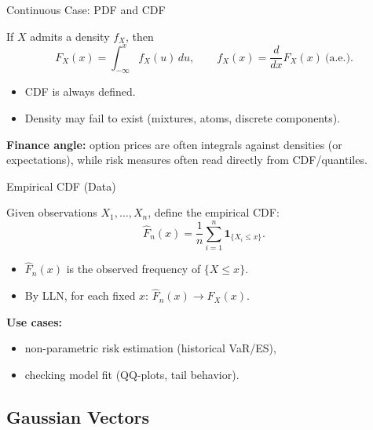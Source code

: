 \documentclass[10pt,aspectratio=169]{beamer}
\begin{document}
\begin{frame}{Continuous Case: PDF and CDF}

If \(X\) admits a density \(f_X\), then\pause
\[
F_X(x) = \int_{-\infty}^{x} f_X(u)\,du,
\qquad
f_X(x) = \frac{d}{dx}F_X(x)\ \text{(a.e.)}.
\]
\pause

\medskip
\begin{itemize}
  \item CDF is always defined.\pause
  \item Density may fail to exist (mixtures, atoms, discrete components).\pause
\end{itemize}

\medskip
\textbf{Finance angle:}\pause\;
option prices are often integrals against densities (or expectations), while risk measures often read directly from CDF/quantiles.
\end{frame}

\begin{frame}{Empirical CDF (Data)}

Given observations \(X_1,\dots,X_n\), define the empirical CDF:\pause
\[
\widehat{F}_n(x)
=
\frac{1}{n}\sum_{i=1}^n \mathbf{1}_{\{X_i\le x\}}.
\]
\pause

\begin{itemize}
  \item \(\widehat{F}_n(x)\) is the observed frequency of \(\{X\le x\}\).\pause
  \item By LLN, for each fixed \(x\): \(\widehat{F}_n(x)\to F_X(x)\).\pause
\end{itemize}

\medskip
\textbf{Use cases:}\pause
\begin{itemize}
  \item non-parametric risk estimation (historical VaR/ES),\pause
  \item checking model fit (QQ-plots, tail behavior).
\end{itemize}

\end{frame}

\subsection{Gaussian Vectors}
\end{document}
